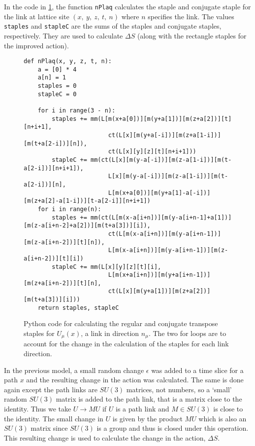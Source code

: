 \documentclass[11pt]{article}
\begin{document}
In the code in \ref{fig:ComputePlaqStaples}, the function \texttt{nPlaq} calculates the staple and conjugate staple for the link at lattice site $(x,\ y,\ z,\ t,\ n)$ where $n$ specifies the link. The values \texttt{staples} and \texttt{stapleC} are the sums of the staples and conjugate staples, respectively. They are used to calculate $\Delta S$ (along with the rectangle staples for the improved action).
\begin{figure}[h]
\begin{lstlisting}
def nPlaq(x, y, z, t, n):
    a = [0] * 4
    a[n] = 1
    staples = 0
    stapleC = 0

    for i in range(3 - n):
        staples += mm(L[m(x+a[0])][m(y+a[1])][m(z+a[2])][t][n+i+1],
                        ct(L[x][m(y+a[-i])][m(z+a[1-i])][m(t+a[2-i])][n]),
                        ct(L[x][y][z][t][n+i+1]))
        stapleC += mm(ct(L[x][m(y-a[-i])][m(z-a[1-i])][m(t-a[2-i])][n+i+1]),
                        L[x][m(y-a[-i])][m(z-a[1-i])][m(t-a[2-i])][n],
                        L[m(x+a[0])][m(y+a[1]-a[-i])][m(z+a[2]-a[1-i])][t-a[2-i]][n+i+1])
    for i in range(n):
        staples += mm(ct(L[m(x-a[i+n])][m(y-a[i+n-1]+a[1])][m(z-a[i+n-2]+a[2])][m(t+a[3])][i]),
                        ct(L[m(x-a[i+n])][m(y-a[i+n-1])][m(z-a[i+n-2])][t][n]),
                        L[m(x-a[i+n])][m(y-a[i+n-1])][m(z-a[i+n-2])][t][i])
        stapleC += mm(L[x][y][z][t][i],
                        L[m(x+a[i+n])][m(y+a[i+n-1])][m(z+a[i+n-2])][t][n],
                        ct(L[x][m(y+a[1])][m(z+a[2])][m(t+a[3])][i]))
    return staples, stapleC
\end{lstlisting}
\caption{Python code for calculating the regular and conjugate transpose staples for $U_\mu(x)$, a link in direction $n_\mu$. The two for loops are to account for the change in the calculation of the staples for each link direction.}
\label{fig:ComputePlaqStaples}
\end{figure}

In the previous model, a small random change $\epsilon$ was added to a time slice for a path $x$ and the resulting change in the action was calculated. The same is done again except the path links are $SU(3)$ matrices, not numbers, so a `small' random $SU(3)$ matrix is added to the path link, that is a matrix close to the identity. Thus we take $U\to MU$ if $U$ is a path link and $M\in SU(3)$ is close to the identity. The small change in $U$ is given by the product $MU$ which is also an $SU(3)$ matrix since $SU(3)$ is a group and thus is closed under this operation. This resulting change is used to calculate the change in the action, $\Delta S$.
\end{document}
